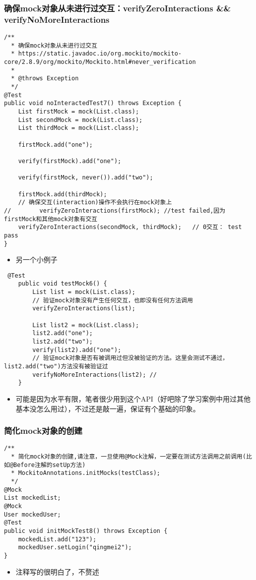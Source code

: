 \documentclass[9pt, b5paper]{article}
\begin{document}
\subsubsection{确保mock对象从未进行过交互：verifyZeroInteractions \&\& verifyNoMoreInteractions}
\label{sec-1-1-7}
\begin{verbatim}
/**
  * 确保mock对象从未进行过交互
  * https://static.javadoc.io/org.mockito/mockito-core/2.8.9/org/mockito/Mockito.html#never_verification
  *
  * @throws Exception
  */
@Test
public void noInteractedTest7() throws Exception {
    List firstMock = mock(List.class);
    List secondMock = mock(List.class);
    List thirdMock = mock(List.class);

    firstMock.add("one");

    verify(firstMock).add("one");

    verify(firstMock, never()).add("two");

    firstMock.add(thirdMock);
    // 确保交互(interaction)操作不会执行在mock对象上
//        verifyZeroInteractions(firstMock); //test failed,因为firstMock和其他mock对象有交互
    verifyZeroInteractions(secondMock, thirdMock);   // 0交互： test pass
}
\end{verbatim}
\begin{itemize}
\item 另一个小例子
\end{itemize}
\begin{verbatim}
 @Test
    public void testMock6() {
        List list = mock(List.class);
        // 验证mock对象没有产生任何交互，也即没有任何方法调用
        verifyZeroInteractions(list);

        List list2 = mock(List.class);
        list2.add("one");
        list2.add("two");
        verify(list2).add("one");
        // 验证mock对象是否有被调用过但没被验证的方法。这里会测试不通过，list2.add("two")方法没有被验证过
        verifyNoMoreInteractions(list2); // 
    }
\end{verbatim}
\begin{itemize}
\item 可能是因为水平有限，笔者很少用到这个API（好吧除了学习案例中用过其他基本没怎么用过），不过还是敲一遍，保证有个基础的印象。
\end{itemize}
\subsubsection{简化mock对象的创建}
\label{sec-1-1-8}
\begin{verbatim}
/**
  * 简化mock对象的创建,请注意，一旦使用@Mock注解，一定要在测试方法调用之前调用(比如@Before注解的setUp方法)
  * MockitoAnnotations.initMocks(testClass);
  */
@Mock
List mockedList;
@Mock
User mockedUser;
@Test
public void initMockTest8() throws Exception {
    mockedList.add("123");
    mockedUser.setLogin("qingmei2");
}
\end{verbatim}
\begin{itemize}
\item 注释写的很明白了，不赘述
\end{itemize}
\end{document}
